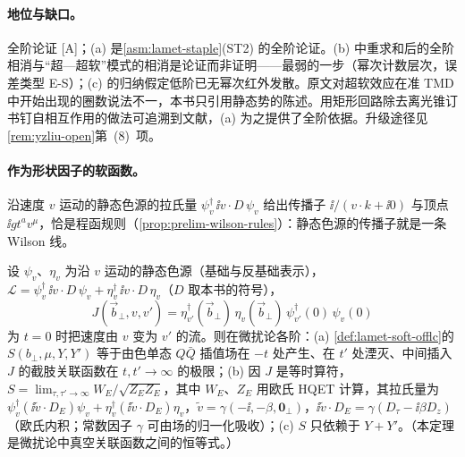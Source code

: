 \paragraph{地位与缺口。}全阶论证 [A]；(a) 是\cref{asm:lamet-staple}(ST2) 的全阶论证。(b) 中重求和后的全阶相消与“超—超软”模式的相消是论证而非证明——最弱的一步（幂次计数层次，误差类型 E-S）；(c) 的归纳假定低阶已无幂次红外发散。原文对超软效应在准 TMD 中开始出现的圈数说法不一，本书只引用静态势的陈述。用矩形回路除去离光锥订书钉自相互作用的做法可追溯到文献\cite{Collins:2008ht,Ji:2018hvs}，(a) 为之提供了全阶依据。升级途径见\cref{rem:yzliu-open}第~(8)~项。

\paragraph{作为形状因子的软函数。}沿速度 $v$ 运动的静态色源的拉氏量 $\psi_v^\dagger\,\ii v\cdot D\,\psi_v$ 给出传播子 $\ii/(v\cdot k+\ii0)$ 与顶点 $\ii gt^av^\mu$，恰是程函规则（\cref{prop:prelim-wilson-rules}）：静态色源的传播子就是一条 Wilson 线。

\begin{theorem}\label{thm:yzliu-soft-hqet}
设 $\psi_v$、$\eta_v$ 为沿 $v$ 运动的静态色源（基础与反基础表示），$\mathcal L=\psi_v^\dagger\,\ii v\cdot D\,\psi_v+\eta_v^\dagger\,\ii v\cdot D\,\eta_v$（$D$ 取本书的符号），
\begin{equation}\label{eq:yzliu-hqet-J}
J(\vec b_\perp,v,v')=\eta^\dagger_{v'}(\vec b_\perp)\,\eta_v(\vec b_\perp)\,\psi^\dagger_{v'}(0)\,\psi_v(0)
\end{equation}
为 $t=0$ 时把速度由 $v$ 变为 $v'$ 的流。则在微扰论各阶：(a) \cref{def:lamet-soft-offlc}的 $S(b_\perp,\mu,Y,Y')$ 等于由色单态 $Q\bar Q$ 插值场在 $-t$ 处产生、在 $t'$ 处湮灭、中间插入 $J$ 的截肢关联函数在 $t,t'\to\infty$ 的极限；(b) 因 $J$ 是等时算符，$S=\lim_{\tau,\tau'\to\infty}W_E/\sqrt{Z_EZ_E}$，其中 $W_E$、$Z_E$ 用欧氏 HQET 计算，其拉氏量为 $\psi_v^\dagger(\ii\tilde v\cdot D_E)\psi_v+\eta_v^\dagger(\ii\tilde v\cdot D_E)\eta_v$，$\tilde v=\gamma(-\ii,-\beta,\mathbf 0_\perp)$，$\ii\tilde v\cdot D_E=\gamma(D_\tau-\ii\beta D_z)$（欧氏内积；常数因子 $\gamma$ 可由场的归一化吸收）；(c) $S$ 只依赖于 $Y+Y'$。（本定理是微扰论中真空关联函数之间的恒等式。）%
\end{theorem}

